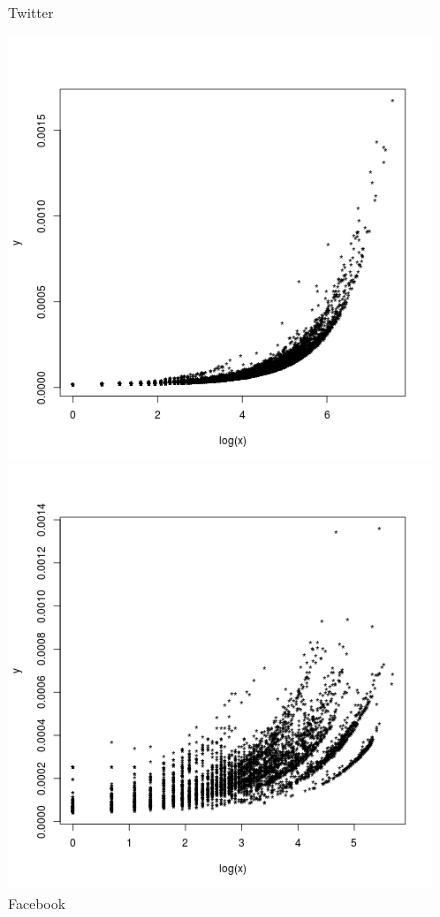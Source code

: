 \documentclass[palatino]{apuntes}
\begin{document}
\begin{figure}[h!] 
\centering 
\begin{minipage}[b]{0.4\textwidth}
	\caption{Twitter}
	\includegraphics[scale=0.45]{img/twitter_grado-pr}
\end{minipage}
\hfill
\begin{minipage}[b]{0.4\textwidth}
	\caption{Facebook}
	\includegraphics[scale=0.45]{img/fb_grado-pr}
\end{minipage}
\end{figure} 
\end{document}

